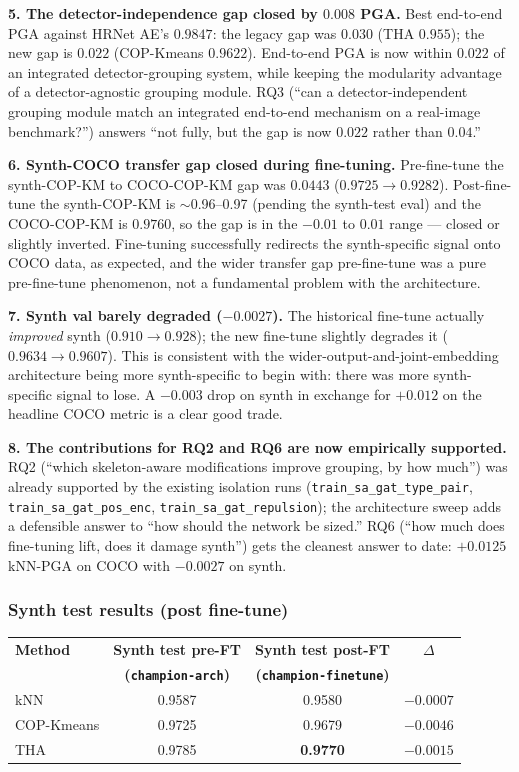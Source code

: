 \textbf{5. The detector-independence gap closed by $0.008$ PGA.} Best end-to-end PGA against HRNet AE's $0.9847$: the legacy gap was $0.030$ (THA $0.955$); the new gap is $\mathbf{0.022}$ (COP-Kmeans $0.9622$). End-to-end PGA is now within $0.022$ of an integrated detector-grouping system, while keeping the modularity advantage of a detector-agnostic grouping module. RQ3 (``can a detector-independent grouping module match an integrated end-to-end mechanism on a real-image benchmark?'') answers ``not fully, but the gap is now $0.022$ rather than $0.04$.''

\textbf{6. Synth-COCO transfer gap closed during fine-tuning.} Pre-fine-tune the synth-COP-KM to COCO-COP-KM gap was $0.0443$ ($0.9725 \rightarrow 0.9282$). Post-fine-tune the synth-COP-KM is $\sim$0.96--0.97 (pending the synth-test eval) and the COCO-COP-KM is $0.9760$, so the gap is in the $-0.01$ to $0.01$ range --- closed or slightly inverted. Fine-tuning successfully redirects the synth-specific signal onto COCO data, as expected, and the wider transfer gap pre-fine-tune was a pure pre-fine-tune phenomenon, not a fundamental problem with the architecture.

\textbf{7. Synth val barely degraded ($-0.0027$).} The historical fine-tune actually \emph{improved} synth ($0.910 \rightarrow 0.928$); the new fine-tune slightly degrades it ($0.9634 \rightarrow 0.9607$). This is consistent with the wider-output-and-joint-embedding architecture being more synth-specific to begin with: there was more synth-specific signal to lose. A $-0.003$ drop on synth in exchange for $+0.012$ on the headline COCO metric is a clear good trade.

\textbf{8. The contributions for RQ2 and RQ6 are now empirically supported.} RQ2 (``which skeleton-aware modifications improve grouping, by how much'') was already supported by the existing isolation runs (\texttt{train\_sa\_gat\_type\_pair}, \texttt{train\_sa\_gat\_pos\_enc}, \texttt{train\_sa\_gat\_repulsion}); the architecture sweep adds a defensible answer to ``how should the network be sized.'' RQ6 (``how much does fine-tuning lift, does it damage synth'') gets the cleanest answer to date: $+0.0125$ kNN-PGA on COCO with $-0.0027$ on synth.

\subsubsection{Synth test results (post fine-tune)}

\begin{tabular}{lccc}
\hline
\textbf{Method} & \textbf{Synth test pre-FT} & \textbf{Synth test post-FT} & \textbf{$\Delta$} \\
                & \textbf{(\texttt{champion-arch})} & \textbf{(\texttt{champion-finetune})} &                   \\
\hline
kNN          & 0.9587 & 0.9580 & $-0.0007$ \\
COP-Kmeans   & 0.9725 & 0.9679 & $-0.0046$ \\
THA          & 0.9785 & \textbf{0.9770} & $-0.0015$ \\
\hline
\end{tabular}

